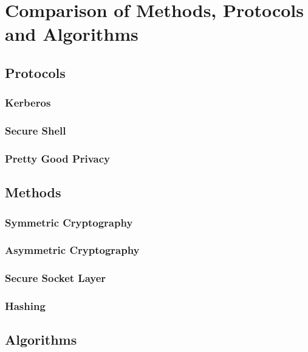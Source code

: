 \chapter{Comparison of Methods, Protocols and Algorithms}

\section{Protocols}

\subsection{Kerberos}
\subsection{Secure Shell}
\subsection{Pretty Good Privacy}

\section{Methods}

\subsection{Symmetric Cryptography}
\subsection{Asymmetric Cryptography}
\subsection{Secure Socket Layer}
\subsection{Hashing}

\section{Algorithms}

